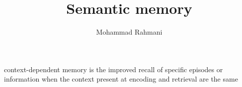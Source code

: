 \documentclass[a4paper]{article}
\title{Semantic memory}
\date{}
\author{Mohammad Rahmani}
\begin{document}
    \maketitle
    context-dependent memory is the improved recall of specific episodes or information when the context present at encoding and retrieval are the same 
    
    
\end{document}
